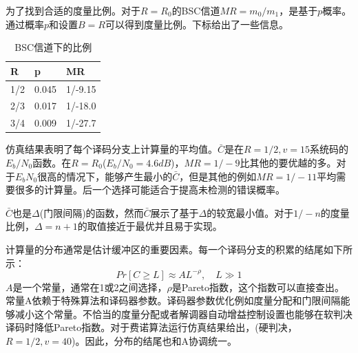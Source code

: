 \documentclass[twoside,numberorder]{buptthesis}
\begin{document}
为了找到合适的度量比例。对于$R=R_0$的BSC信道$MR=m_0/m_1$，是基于$p$概率。通过概率$p$和设置$B=R$可以得到度量比例。下标给出了一些信息。
\begin{table}
  \centering
    \caption{BSC信道下的比例}
  \label{tab:3}
  \begin{tabular}{C{3cm}C{3cm}C{3cm}}
    \hline
    R&p&MR\\
    /2&0.045&1/-9.15\\
    2/3&0.017&1/-18.0\\
    3/4&0.009&1/-27.7\\
    \hline
  \end{tabular}

\end{table}
仿真结果表明了每个译码分支上计算量的平均值。$\bar{C}$是在$R=1/2,v=15$系统码的$E_b/N_0$函数。在$R=R_0$($E_b/N_0=4.6dB$)，$MR=1/-9$比其他的要优越的多。对于$E_bN_0$很高的情况下，能够产生最小的$\bar{C}$，但是其他的例如$MR=1/-11$平均需要很多的计算量。后一个选择可能适合于提高未检测的错误概率。

$\bar{C}$也是$\Delta$(门限间隔)的函数，然而$\bar{C}$展示了基于$\Delta$的较宽最小值。对于$1/-n$的度量比例，$\Delta=n+1$的取值接近于最优并且易于实现。

计算量的分布通常是估计缓冲区的重要因素。每一个译码分支的积累的结尾如下所示：
\begin{equation}
  Pr[C\ge L]\approx AL^{-\rho},\quad L\gg 1
  \label{equ:22}
\end{equation}
$A$是一个常量，通常在1或2之间选择，$\rho$是Pareto指数，这个指数可以直接查出。常量A依赖于特殊算法和译码器参数。译码器参数优化例如度量分配和门限间隔能够减小这个常量。不恰当的度量分配或者解调器自动增益控制设置也能够在软判决译码时降低Pareto指数。对于费诺算法运行仿真结果给出，(硬判决，$R=1/2,v=40$)。因此，分布的结尾也和A协调统一。
\end{document}
